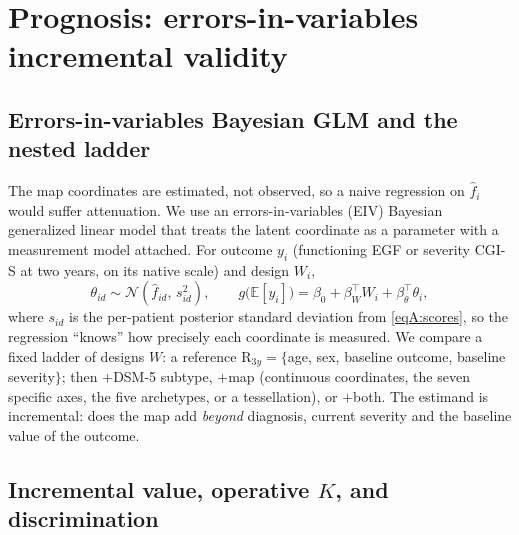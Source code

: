 \section{Prognosis: errors-in-variables incremental validity}
\label{ann:prognosis}

\subsection{Errors-in-variables Bayesian GLM and the nested ladder}

The map coordinates are estimated, not observed, so a naive regression on $\hat f_i$
would suffer attenuation. We use an errors-in-variables (EIV) Bayesian generalized
linear model that treats the latent coordinate as a parameter with a measurement model
attached. For outcome $y_i$ (functioning EGF or severity CGI-S at two years, on its
native scale) and design $W_i$,
\begin{equation}
  \theta_{id}\sim\mathcal N(\hat f_{id},\,s_{id}^2),\qquad
  g\big(\mathbb E[y_i]\big)=\beta_0+\beta_W^{\top}W_i+\beta_\theta^{\top}\theta_i ,
  \label{eqD:eiv}
\end{equation}
where $s_{id}$ is the per-patient posterior standard deviation from \eqref{eqA:scores},
so the regression ``knows'' how precisely each coordinate is measured. We compare a
fixed ladder of designs $W$: a reference $\mathrm R_{3y}=\{$age, sex, baseline outcome,
baseline severity$\}$; then $+$DSM-5 subtype, $+$map (continuous coordinates,
the seven specific axes, the five archetypes, or a tessellation), or $+$both. The
estimand is incremental: does the map add \emph{beyond} diagnosis, current severity and
the baseline value of the outcome.

\subsection{Incremental value, operative \texorpdfstring{$K$}{K}, and discrimination}

